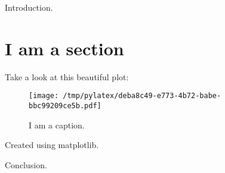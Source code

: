 \documentclass{article}%
\begin{document}
%
\normalsize%
Introduction.%
\section{I am a section}%
\label{sec:Iamasection}%
Take a look at this beautiful plot:%


\begin{figure}[htbp]%
\centering%
\texttt{[image: /tmp/pylatex/deba8c49-e773-4b72-babe-bbc99209ce5b.pdf]}%
\caption{I am a caption.}%
\end{figure}

%
Created using matplotlib.

%
Conclusion.%
\end{document}
